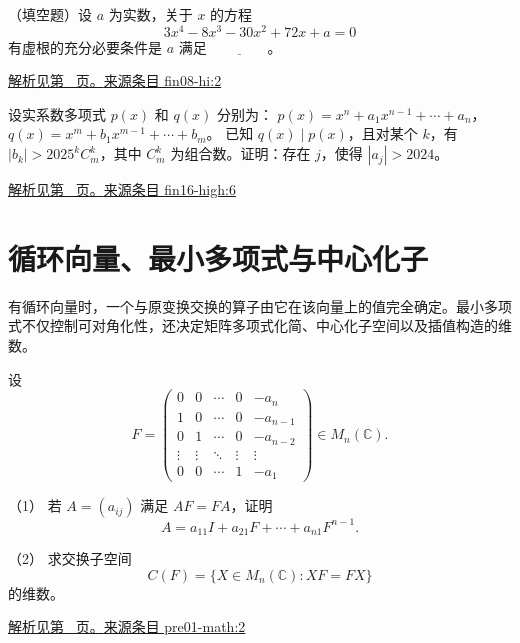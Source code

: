 \documentclass[12pt,fontset=fandol]{ctexart}
\begin{document}
\begin{example}\label{ex:fin08-hi:2}

（填空题）设 $a$ 为实数，关于 $x$ 的方程
\[
3x^{4}-8x^{3}-30x^{2}+72x+a=0
\]
有虚根的充分必要条件是 $a$ 满足 $\underline{\qquad\qquad}$。

\par\hyperref[ans:fin08-hi:2]{解析见第~\pageref{ans:fin08-hi:2} 页。}\quad\href{https://github.com/lzxcr/cmc-mathematics/blob/64916fa1fdbc3e444a652eca204d5669058ee321/src/problems/finals/08/02.md}{来源条目 fin08-hi:2}

\end{example}

\begin{example}\label{ex:fin16-high:6}

设实系数多项式 $p(x)$ 和 $q(x)$ 分别为：
$p(x) = x^n + a_1 x^{n-1} + \cdots + a_n$，$q(x) = x^m + b_1 x^{m-1} + \cdots + b_m$。
已知 $q(x) \mid p(x)$，且对某个 $k$，有 $|b_k| > 2025^k C_m^k$，其中 $C_m^k$ 为组合数。证明：存在 $j$，使得 $|a_j| > 2024$。

\par\hyperref[ans:fin16-high:6]{解析见第~\pageref{ans:fin16-high:6} 页。}\quad\href{https://github.com/lzxcr/cmc-mathematics/blob/64916fa1fdbc3e444a652eca204d5669058ee321/src/problems/finals/16/06.md}{来源条目 fin16-high:6}

\end{example}

\section{循环向量、最小多项式与中心化子}

\label{sec:questions-5}

有循环向量时，一个与原变换交换的算子由它在该向量上的值完全确定。最小多项式不仅控制可对角化性，还决定矩阵多项式化简、中心化子空间以及插值构造的维数。

\begin{example}\label{ex:pre01-math:2}

设
\[
F=\begin{pmatrix}
0&0&\cdots&0&-a_n\\
1&0&\cdots&0&-a_{n-1}\\
0&1&\cdots&0&-a_{n-2}\\
\vdots&\vdots&\ddots&\vdots&\vdots\\
0&0&\cdots&1&-a_1
\end{pmatrix}\in M_n(\mathbb C).
\]

（1） 若 $A=(a_{ij})$ 满足 $AF=FA$，证明
\[
A=a_{11}I+a_{21}F+\cdots+a_{n1}F^{n-1}.
\]

（2） 求交换子空间
\[
C(F)=\{X\in M_n(\mathbb C):XF=FX\}
\]
的维数。

\par\hyperref[ans:pre01-math:2]{解析见第~\pageref{ans:pre01-math:2} 页。}\quad\href{https://github.com/lzxcr/cmc-mathematics/blob/64916fa1fdbc3e444a652eca204d5669058ee321/src/problems/preliminary/01/02.md}{来源条目 pre01-math:2}

\end{example}
\end{document}

